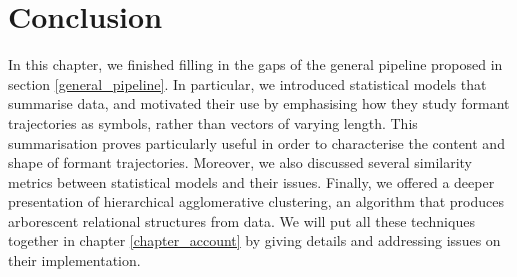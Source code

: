 \documentclass[../main.tex]{subfiles}
\begin{document}
\section{Conclusion}
In this chapter, we finished filling in the gaps of the general pipeline proposed in section \ref{general_pipeline}. In particular, we introduced statistical models that summarise data, and motivated their use by emphasising how they study formant trajectories as symbols, rather than vectors of varying length. This summarisation proves particularly useful in order to characterise the content and shape of formant trajectories. Moreover, we also discussed several similarity metrics between statistical models and their issues. Finally, we offered a deeper presentation of hierarchical agglomerative clustering, an algorithm that produces arborescent relational structures from data. We will put all these techniques together in chapter \ref{chapter_account} by giving details and addressing issues on their implementation.
\end{document}
